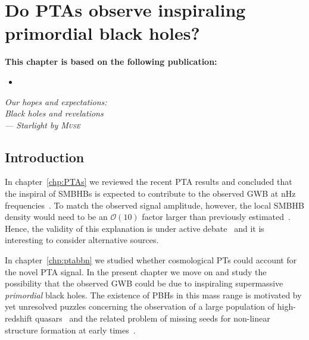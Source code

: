 \chapter{Do PTAs observe inspiraling primordial black holes?} \label{chp:pbh}

\begin{tcolorbox}[colframe=DESYcyan, colback=DESYcyan!10]
	\textbf{This chapter is based on the following publication:}
	\begin{itemize}[leftmargin=17pt]
		\item[\cite{Depta:2023qst}] 
	\end{itemize}
\end{tcolorbox}
\vspace{0.5cm}

\begin{flushright}
	\slshape
	Our hopes and expectations:\\
	Black holes and revelations\\ \medskip
	--- Starlight by \textsc{Muse}
\end{flushright}


\section{Introduction}

In chapter~\ref{chp:PTAs} we reviewed the recent \ac{PTA} results and concluded that the inspiral of \acp{SMBHB} is expected to contribute to  the observed \ac{GWB} at nHz frequencies~\cite{NANOGrav:2020bcs}. To match the observed signal amplitude, however, the local \ac{SMBHB} density would need to be an $\mathcal{O}(10)$ factor larger than previously
estimated~\cite{Casey-Clyde:2021xro,Kelley:2016gse, Kelley:2017lek}. Hence, the validity of this explanation is under active debate~\cite{Middleton:2020asl,Izquierdo-Villalba:2021prf,Curylo:2021pvf,Somalwar:2023bqv} and it is interesting to consider alternative sources.

In chapter~\ref{chp:ptabbn} we studied whether cosmological \acp{PT} could account for the novel \ac{PTA} signal. In the present chapter we move on and study the possibility that the observed \ac{GWB} could be due to inspiraling supermassive \textit{primordial} black holes.  The existence of \acp{PBH} in this mass range is motivated by yet unresolved puzzles concerning the observation of a large population of high-redshift quasars~\cite{Volonteri:2010wz, Volonteri:2021sfo, Shapiro:2004ud, Volonteri:2006ma, Tanaka:2008bv} and the related problem of missing seeds for non-linear structure formation at early times~\cite{Carr:2018rid, Hooper:2023nnl}.

